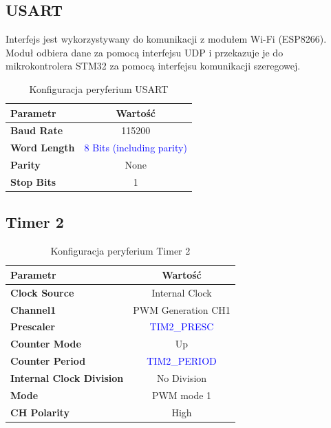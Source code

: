 \documentclass[10pt, a4paper]{article}
\begin{document}
\subsection{USART}

Interfejs jest wykorzystywany do komunikacji z modułem Wi-Fi (ESP8266). Moduł odbiera dane za pomocą interfejsu UDP i przekazuje je do mikrokontrolera STM32 za pomocą interfejsu komunikacji szeregowej.

\begin{table}[H]
	\centering
	\begin{tabular}{|l|c|} \hline
		\textbf{Parametr} & Wartość \\
		\hline
		\hline  \textbf{Baud Rate}&115200  \\\hline
		\textbf{Word Length } & \textcolor{blue}{8 Bits (including parity)}\\\hline
		\textbf{Parity} &  None\\
		\hline
		\textbf{Stop Bits}& 1\\
		\hline
	\end{tabular}
	\caption{Konfiguracja peryferium USART}
	\label{tab:USART}
\end{table}

\subsection{Timer 2}

\begin{table}[H]
	\centering
	\begin{tabular}{|l|c|} \hline
		\textbf{Parametr} & Wartość \\
		\hline
		\hline  \textbf{Clock Source}&Internal Clock  \\\hline
		\textbf{Channel1} & PWM Generation CH1\\\hline
		\textbf{Prescaler} & \textcolor{blue}{TIM2\_PRESC}\\\hline
		\textbf{Counter Mode} &  Up\\
		\hline
		\textbf{Counter Period}& \textcolor{blue}{TIM2\_PERIOD}\\\hline
		\textbf{Internal Clock Division}& No Division\\
		\hline
		\textbf{Mode}& PWM mode 1\\
		\hline
		\textbf{CH Polarity}& High\\
		\hline
	\end{tabular}
	\caption{Konfiguracja peryferium Timer 2}
	\label{tab:Timer2}
\end{table}
\end{document}

